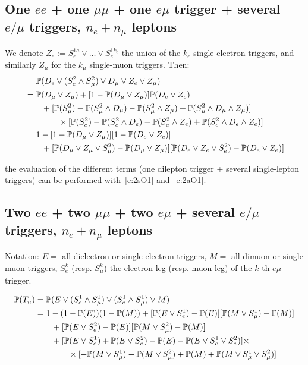 \documentclass{article}
\newcommand{\pro}{\ensuremath{\mathbb{P}}}
\begin{document}
\subsection{One $ee$ + one $\mu\mu$ + one $e\mu$ trigger + several $e/\mu$ triggers, $n_e+n_\mu$ leptons}

We denote $Z_e:=S_e^{1a}\vee\ldots\vee S_e^{1{k_e}}$ the union of the $k_e$ single-electron triggers, 
and similarly $Z_\mu$ for the $k_\mu$ single-muon triggers. Then: 
\begin{align}
&\quad\,\,\pro(D_e \vee (S_e^2\wedge S_\mu^2) \vee D_\mu \vee Z_e \vee Z_\mu)\notag\\
&=
\pro(D_\mu \vee Z_\mu)
+ [1-\pro(D_\mu \vee Z_\mu)]\pro(D_e \vee Z_e)\notag\\
&\qquad+ [\pro(S_\mu^2) - \pro(S_\mu^2\wedge D_\mu) 
- \pro(S_\mu^2\wedge Z_\mu)+ \pro(S_\mu^2\wedge D_\mu\wedge Z_\mu)]\notag\\
&\qquad\qquad\times[\pro(S_e^2) - \pro(S_e^2\wedge D_e) - \pro(S_e^2\wedge Z_e) + \pro(S_e^2\wedge D_e\wedge Z_e)]\notag\\
&=
1
- [1-\pro(D_\mu \vee Z_\mu)][1-\pro(D_e \vee Z_e)]\notag\\
&\qquad+[\pro(D_\mu\vee Z_\mu\vee S_\mu^2) - \pro(D_\mu\vee Z_\mu)]
[\pro(D_e\vee Z_e \vee S_e^2) - \pro(D_e\vee Z_e)]
\end{align}

the evaluation of the different terms (one dilepton trigger + several single-lepton triggers) can be performed 
with~\ref{e:2sO1} and~\ref{e:2aO1}. 


\subsection{Two $ee$ + two $\mu\mu$ + two $e\mu$ + several $e/\mu$ triggers, $n_e+n_\mu$ leptons}

Notation: $E=$ all dielectron or single electron triggers, $M=$ all dimuon or single muon triggers, 
$S_e^k$ (resp. $S_\mu^k$) the electron leg (resp. muon leg) of the $k$-th $e\mu$ trigger. 

\begin{align}
\pro(T_n)&=\pro(E\vee (S_e^1\wedge S_\mu^1)\vee(S_e^1\wedge S_\mu^1)\vee M)\notag\\
&= 1 - (1-\pro(E))(1-\pro(M)) + [\pro(E\vee S_e^1)-\pro(E)][\pro(M\vee S_\mu^1)-\pro(M)]\notag\\
&\qquad + [\pro(E\vee S_e^2)-\pro(E)][\pro(M\vee S_\mu^2)-\pro(M)]\notag\\
&\qquad + [\pro(E\vee S_e^1)+\pro(E\vee S_e^2)-\pro(E)-\pro(E\vee S_e^1\vee S_e^2)]\times\notag\\
&\qquad\qquad\times[-\pro(M\vee S_\mu^1)-\pro(M\vee S_\mu^2)+\pro(M)+\pro(M\vee S_\mu^1\vee S_\mu^2)]
\end{align}
\end{document}
